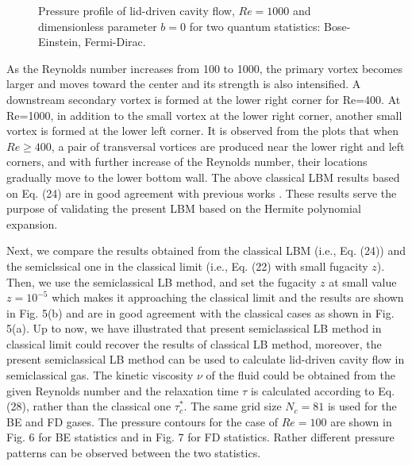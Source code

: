 \documentclass[doublecol]{epl2}
\begin{document}
\begin{figure}[ht]
	\centering
	\vfill
	\caption[A set of four subfigures.]{Pressure profile of lid-driven cavity flow, $Re=1000$ and dimensionless parameter $b=0$ for two quantum statistics:
	 Bose-Einstein, 
	 Fermi-Dirac.}
	\label{fig:pressure_profile_b0}
\end{figure}

As the Reynolds number increases from 100 to 1000, the primary vortex becomes larger and moves toward the center and its strength is also intensified. A downstream secondary vortex is formed at the lower right corner for Re=400.  At Re=1000, in addition to the small vortex at the lower right corner, another small vortex is formed at the lower left corner. It is observed from the plots that when $Re \ge 400$, a pair of transversal vortices are produced near the lower right and left corners, and with further increase of the Reynolds number, their locations gradually move to the lower bottom wall. The above classical LBM results based on Eq. (24) are in good agreement with previous works \cite{Ku1987,Hou1995,Yang1998,Alben2005}. These results serve the purpose of validating the present LBM based on the Hermite polynomial expansion.

Next, we compare the results obtained from the classical LBM (i.e., Eq. (24)) and the semiclssical one in the classical limit (i.e., Eq. (22) with small fugacity $z$). Then, we use the semiclassical LB method, and set the fugacity $z$ at small value $z=10^{-5}$ which makes it approaching the classical limit and the results are shown in Fig. 5(b) and are in good agreement with the classical cases as shown in Fig. 5(a). Up to now, we have illustrated that present semiclassical LB method in classical limit could recover the results of classical LB method, moreover, the present semiclassical LB method can be used to calculate lid-driven cavity flow in semiclassical gas. The kinetic viscosity $\nu$ of the fluid could be obtained from the given Reynolds number and the relaxation time $\tau$ is calculated according to Eq. (28), rather than the classical one $\tau_c^*$. The same grid size $N_c=81$ is used for the BE and FD gases.  The pressure contours for the case of $Re=100$ are shown in Fig. 6 for BE statistics and in Fig. 7 for FD statistics. Rather different pressure patterns can be observed between the two statistics.
\end{document}
